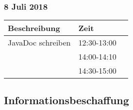 \documentclass[a4paper, 11pt]{article}
\begin{document}
\subsubsection{8 Juli 2018}

\begin{tabular}{llr}
\toprule
Beschreibung & Zeit \\
\midrule
JavaDoc schreiben & 12:30-13:00 \\
 & 14:00-14:10 \\
 & 14:30-15:00\\
\bottomrule
\end{tabular}

\subsection{Informationsbeschaffung}
\end{document}
